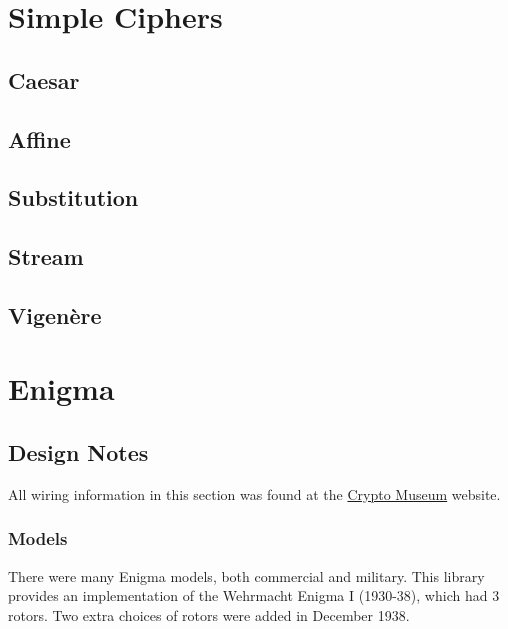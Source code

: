\documentclass{article}
\begin{document}

\section{Simple Ciphers}

\subsection{Caesar}

\subsection{Affine}

\subsection{Substitution}

\subsection{Stream}

\subsection{Vigenère}


\section{Enigma}

\subsection{Design Notes}
All wiring information in this section was found at the
\href{http://www.cryptomuseum.com/crypto/enigma/wiring.htm}{Crypto Museum}
website.

\subsubsection{Models}
There were many Enigma models, both commercial and military. This library
provides an implementation of the Wehrmacht Enigma I (1930-38), which
had 3 rotors. Two extra choices of rotors were added in December 1938.
\end{document}
